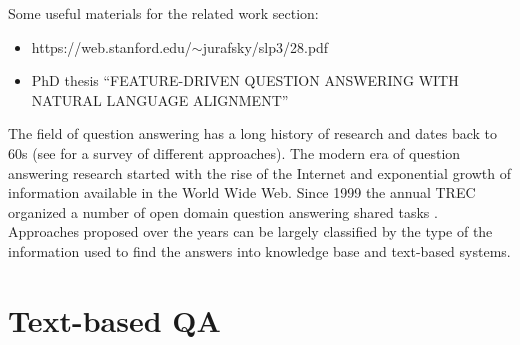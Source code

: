 %

\label{chap:related}

Some useful materials for the related work section:
\begin{itemize}
\item https://web.stanford.edu/$\sim$jurafsky/slp3/28.pdf
\item PhD thesis ``FEATURE-DRIVEN QUESTION ANSWERING WITH NATURAL LANGUAGE ALIGNMENT''
\end{itemize}




The field of question answering has a long history of research and dates back to 60s (see \cite{Kolomiyets:2011:SQA:2046840.2047162} for a survey of different approaches).
The modern era of question answering research started with the rise of the Internet and exponential growth of information available in the World Wide Web.
Since 1999 the annual TREC organized a number of open domain question answering shared tasks \cite{dang2007overview}.
Approaches proposed over the years can be largely classified by the type of the information used to find the answers into knowledge base and text-based systems.

\section{Text-based QA}

